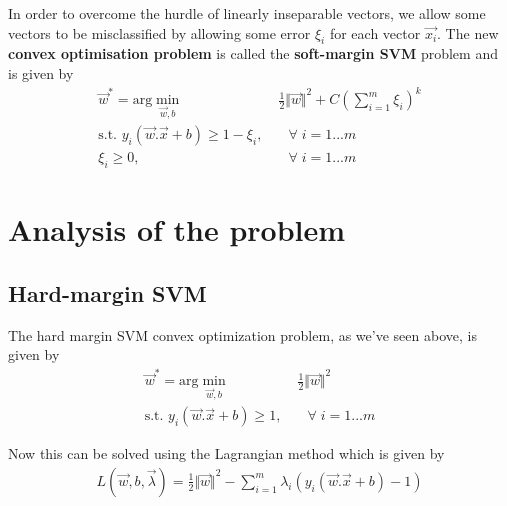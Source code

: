 \documentclass[journal]{IEEEtran}
\begin{document}
In order to overcome the hurdle of linearly inseparable vectors, we allow some vectors to be misclassified by allowing some error $\xi_i$ for each vector $\vec{x_i}$. The new \textbf{convex optimisation problem} is called the \textbf{soft-margin SVM} problem and is given by
\begin{align}
    \vec{w}^* = \text{arg}\min_{\vec{w}, b}&\; \frac{1}{2} \Vert {\vec{w} \Vert}^2 + C \left( \sum_{i=1}^{m} \xi_i \right) ^ k\\
    \text{s.t. } y_i(\vec{w}.\vec{x} + b) \geq 1 - \xi_i, &\quad \forall\; i = 1...m \nonumber \\
    \xi_i \geq 0, &\quad \forall\; i = 1...m \nonumber
\end{align}


\section{\textbf{Analysis of the problem}}
\subsection{Hard-margin SVM}
The hard margin SVM convex optimization problem, as we've seen above, is given by
\begin{align}
    \vec{w}^* = \text{arg}\min_{\vec{w}, b}&\; \frac{1}{2} \Vert {\vec{w} \Vert}^2 \\
    \text{s.t. } y_i(\vec{w}.\vec{x} + b) \geq 1, &\quad \forall\; i = 1...m \nonumber
\end{align}

Now this can be solved using the Lagrangian method which is given by
\begin{align}
    L(\vec{w}, b, \vec{\lambda}) = \frac{1}{2} \Vert {\vec{w} \Vert}^2 - \sum_{i=1}^{m} \lambda_i (y_i(\vec{w}.\vec{x} + b) - 1)
\end{align}
\end{document}
